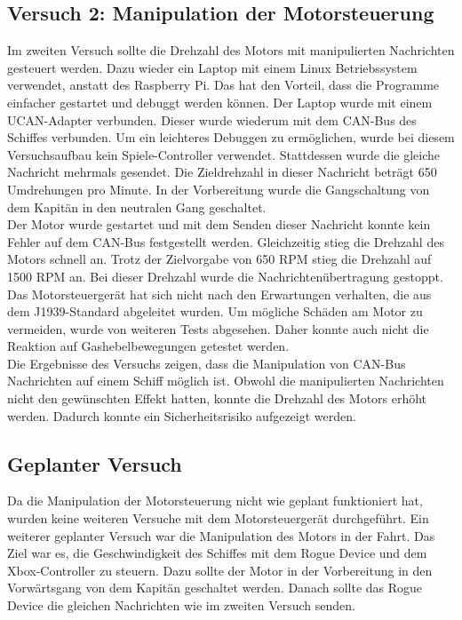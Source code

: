 \subsection{Versuch 2: Manipulation der Motorsteuerung}
Im zweiten Versuch sollte die Drehzahl des Motors mit manipulierten Nachrichten gesteuert werden.
Dazu wieder ein Laptop mit einem Linux Betriebssystem verwendet, anstatt des Raspberry Pi. 
Das hat den Vorteil, dass
die Programme einfacher gestartet und debuggt werden können. Der Laptop wurde mit einem UCAN-Adapter verbunden.  
Dieser wurde wiederum mit dem CAN-Bus des Schiffes verbunden. Um ein leichteres Debuggen zu ermöglichen, wurde bei diesem 
Versuchsaufbau kein Spiele-Controller verwendet. Stattdessen wurde die gleiche Nachricht mehrmals gesendet. Die Zieldrehzahl in 
dieser Nachricht beträgt 650 Umdrehungen pro Minute. In der Vorbereitung wurde die Gangschaltung von dem Kapitän in den neutralen
Gang geschaltet. \\
Der Motor wurde gestartet und mit dem
Senden dieser Nachricht konnte kein Fehler auf dem CAN-Bus festgestellt werden. Gleichzeitig stieg die Drehzahl des Motors
schnell an. Trotz der Zielvorgabe von 650 RPM stieg die Drehzahl auf 1500 RPM an. Bei dieser Drehzahl wurde 
die Nachrichtenübertragung gestoppt. Das Motorsteuergerät hat sich nicht nach den Erwartungen verhalten,
die aus dem J1939-Standard abgeleitet wurden. Um mögliche Schäden am Motor zu vermeiden, wurde von weiteren Tests abgesehen.
Daher konnte auch nicht die Reaktion auf Gashebelbewegungen getestet werden. \\
Die Ergebnisse des Versuchs zeigen, dass die Manipulation von CAN-Bus Nachrichten auf einem Schiff möglich ist.
Obwohl die manipulierten Nachrichten nicht den gewünschten Effekt hatten, konnte die Drehzahl des Motors erhöht werden.
Dadurch konnte ein Sicherheitsrisiko aufgezeigt werden. 

\subsection{Geplanter Versuch}
Da die Manipulation der Motorsteuerung nicht wie geplant funktioniert hat, 
wurden keine weiteren Versuche mit dem Motorsteuergerät durchgeführt. Ein weiterer geplanter Versuch 
war die Manipulation des Motors in der Fahrt. Das Ziel war es, die Geschwindigkeit des Schiffes mit dem Rogue Device und 
dem Xbox-Controller zu steuern.
Dazu sollte der Motor in der Vorbereitung in den Vorwärtsgang von dem Kapitän geschaltet werden.
Danach sollte das Rogue Device die gleichen Nachrichten wie im zweiten Versuch senden.

